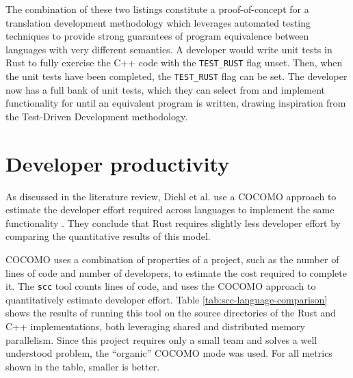 The combination of these two listings constitute a proof-of-concept for a translation development methodology which leverages automated testing techniques to provide strong guarantees of program equivalence between languages with very different semantics. A developer would write unit tests in Rust to fully exercise the C++ code with the \texttt{TEST_RUST} flag unset. Then, when the unit tests have been completed, the \texttt{TEST_RUST} flag can be set. The developer now has a full bank of unit tests, which they can select from and implement functionality for until an equivalent program is written, drawing inspiration from the Test-Driven Development methodology.


\section{Developer productivity}
\label{sec:developer-productivity}

As discussed in the literature review, Diehl et al. use a \acrshort{COCOMO} approach to estimate the developer effort required across languages to implement the same functionality \cite{diehlBenchmarkingParallel1D2023}. They conclude that Rust requires slightly less developer effort by comparing the quantitative results of this model.

\acrshort{COCOMO} uses a combination of properties of a project, such as the number of lines of code and number of developers, to estimate the cost required to complete it. The \texttt{scc} tool counts lines of code, and uses the \acrshort{COCOMO} approach to quantitatively estimate developer effort. Table \ref{tab:scc-language-comparison} shows the results of running this tool on the source directories of the Rust and C++ implementations, both leveraging shared and distributed memory parallelism. Since this project requires only a small team and solves a well understood problem, the ``organic'' \acrshort{COCOMO} mode was used. For all metrics shown in the table, smaller is better.

